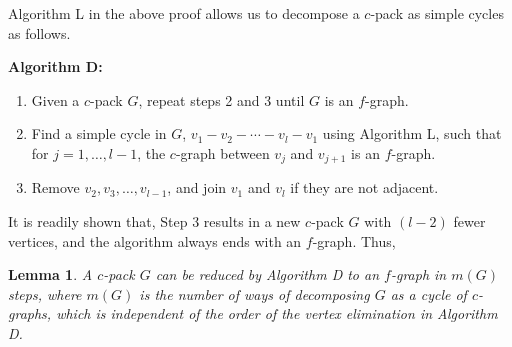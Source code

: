 \documentclass[preprint]{revtex4-1}
\newtheorem{lemm}[thrm]{Lemma}
\begin{document}
Algorithm L in the above proof allows us to
  decompose a $c$-pack as simple cycles as follows.

\textbf{Algorithm D:}
\begin{enumerate}
  \item
    Given a $c$-pack $G$,
      repeat steps 2 and 3 until $G$ is an $f$-graph.
  \item
    Find a simple cycle in $G$,
      $v_1 - v_2 - \cdots - v_l - v_1$
      using Algorithm L,
      such that
      for $j = 1, \dots, l-1$,
      the $c$-graph between $v_j$ and $v_{j+1}$
      is an $f$-graph.
  \item
    Remove $v_2, v_3, \dots, v_{l-1}$,
      and join $v_1$ and $v_l$ if they are not adjacent.
\end{enumerate}
%
It is readily shown that,
  Step 3 results in a new $c$-pack $G$
  with $(l - 2)$ fewer vertices,
  and the algorithm always ends with an $f$-graph.
%
Thus,


\begin{lemm}
  A $c$-pack $G$ can be reduced
    by Algorithm D to an $f$-graph in $m(G)$ steps,
    where $m(G)$ is the number of ways of decomposing
    $G$ as a cycle of $c$-graphs,
    which is independent of the order of the vertex elimination
    in Algorithm D.
\label{thm:hncdecomp}
\end{lemm}
\end{document}
